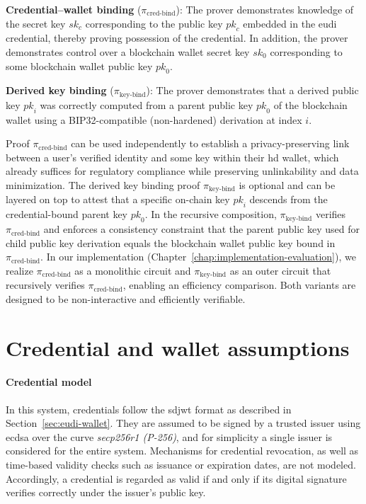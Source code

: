 \medskip
\textbf{Credential–wallet binding} ($\pi_{\text{cred-bind}}$): The prover demonstrates knowledge of the secret key $\mathit{sk}_c$ corresponding to the public key $\mathit{pk}_c$ embedded in the \acrshort{eudi} credential, thereby proving possession of the credential. In addition, the prover demonstrates control over a blockchain wallet secret key $\mathit{sk}_0$ corresponding to some blockchain wallet public key $\mathit{pk}_0$.

\medskip	
\textbf{Derived key binding} ($\pi_{\text{key-bind}}$): The prover demonstrates that a derived public key $\mathit{pk}_i$ was correctly computed from a parent public key $\mathit{pk}_0$ of the blockchain wallet using a BIP32-compatible (non-hardened) derivation at index $\mathit{i}$.

\medskip	
Proof $\pi_{\text{cred-bind}}$ can be used independently to establish a privacy-preserving link between a user's verified identity and some key within their \acrshort{hd} wallet, which already suffices for regulatory compliance while preserving unlinkability and data minimization. The derived key binding proof $\pi_{\text{key-bind}}$ is optional and can be layered on top to attest that a specific on-chain key $\mathit{pk}_i$ descends from the credential-bound parent key $\mathit{pk}_0$. In the recursive composition, $\pi_{\text{key-bind}}$ verifies $\pi_{\text{cred-bind}}$ and enforces a consistency constraint that the parent public key used for child public key derivation equals the blockchain wallet public key bound in $\pi_{\text{cred-bind}}$. In our implementation (Chapter~\ref{chap:implementation-evaluation}), we realize $\pi_{\text{cred-bind}}$ as a monolithic circuit and $\pi_{\text{key-bind}}$ as an outer circuit that recursively verifies $\pi_{\text{cred-bind}}$, enabling an efficiency comparison. Both variants are designed to be non-interactive and efficiently verifiable.

\section{Credential and wallet assumptions}
\label{sec:credential-wallet-assumptions}

\paragraph{Credential model}
In this system, credentials follow the \acrshort{sdjwt} format as described in Section~\ref{sec:eudi-wallet}. They are assumed to be signed by a trusted issuer using \acrshort{ecdsa} over the curve \emph{secp256r1 (P-256)}, and for simplicity a single issuer is considered for the entire system. Mechanisms for credential revocation, as well as time-based validity checks such as issuance or expiration dates, are not modeled. Accordingly, a credential is regarded as valid if and only if its digital signature verifies correctly under the issuer’s public key.

